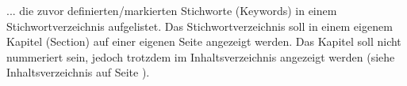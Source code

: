 
... die zuvor definierten/markierten Stichworte (Keywords) in einem Stichwortverzeichnis aufgelistet. Das Stichwortverzeichnis soll in einem eigenem Kapitel (Section) auf einer eigenen Seite angezeigt werden. Das Kapitel soll nicht nummeriert sein, jedoch trotzdem im Inhaltsverzeichnis angezeigt werden (siehe Inhaltsverzeichnis auf Seite \pageref{toc}).
